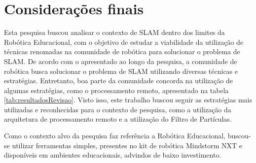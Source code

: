 \chapter[Considerações finais]{Considerações finais}

Esta pesquisa buscou analisar o contexto de SLAM dentro dos limites da Robótica Educacional, com o objetivo de estudar a
viabilidade da utilização de técnicas renomadas na comunidade de robótica para solucionar o problema de SLAM. De acordo com o apresentado ao
longo da pesquisa, a comunidade de robótica busca solucionar o problema de SLAM utilizando diversas
técnicas e estratégias. Entretanto, boa parte da comunidade concorda na utilização de algumas estratégias, como o processamento remoto,
apresentado na tabela \ref{tab:resultadosRevisao}. Visto isso, este trabalho buscou seguir as estratégias mais utilizadas e reconhecidas
 para o contexto de pesquisa, como a utilização da arquitetura de processamento remoto e a utilização do Filtro de Partículas.

Como o contexto alvo da pesquisa faz referência a Robótica Educacional, buscou-se utilizar ferramentas simples,
presentes no kit de robótica Mindstorm NXT e disponíveis em ambientes educacionais, advindos de baixo investimento.
